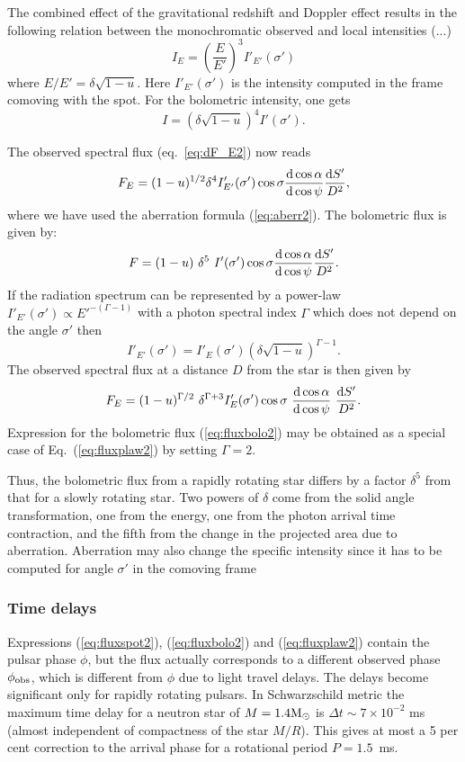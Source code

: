 \documentclass{wihuri}
\def\be{\begin{equation}}
\def\ee{\end{equation}}
\def\msun{{\rm M_{\odot}}}
\def\d{{\rm d}}
\def\Dop{\delta}
\def\phiobs{\phi_{\rm obs}}
\begin{document}
The combined effect of the gravitational redshift and Doppler effect
results in the following  relation between the monochromatic
observed and local intensities
(...)%
\be
I_{E} = \left (\frac{E}{E'}\right )^3 I'_{E '} (\sigma')
\ee
where $E/E'=\Dop \sqrt{1-u}$.
Here $I'_{E'}(\sigma')$ is the intensity computed in the frame comoving with
the spot.
For the bolometric intensity, one gets
\be
I= \left (\Dop \sqrt{1-u} \right )^4 I'(\sigma') .
\ee

The observed spectral flux (eq.~\ref{eq:dF_E2}) now reads
\be \label{eq:fluxspot2}
F_{E}=(1-u)^{1/2} \Dop^{4} I'_{E'}(\sigma') \cos\sigma
\frac{\d \cos\alpha}{\d\cos\psi}
 \frac{\d S'}{D^2} ,
\ee
where we have used the aberration formula (\ref{eq:aberr2}).
The bolometric flux is given by:
\be  \label{eq:fluxbolo2}
F= (1-u)\ \Dop^5 \
I'(\sigma')  \cos\sigma \frac{\d\cos\alpha}{\d\cos\psi} \frac{\d S'}{D^2} .
\ee
If the radiation spectrum can be represented by
a power-law $I'_{E'}(\sigma') \propto E '^{-(\Gamma-1)}$
with a photon spectral index
$\Gamma$ which does not depend on the angle $\sigma'$ then
\be \label{eq:int_trans2}
I'_{E'}(\sigma') = I'_{E}(\sigma')
\left( \Dop \sqrt{1-u} \right)^{\Gamma-1} .
\ee
The observed spectral flux at a distance $D$ from the star is then given by 
\be\label{eq:fluxplaw2}
 F_{E}= (1-u)^{\Gamma/2}\ \Dop^{\Gamma+3} I'_E(\sigma')
\cos\sigma\ \frac{\d\cos\alpha}{\d\cos\psi}\ \frac{\d S'}{D^2}.
\ee
Expression for the bolometric flux (\ref{eq:fluxbolo2})
may be obtained as a special case of Eq.~(\ref{eq:fluxplaw2}) by setting $\Gamma=2$. 

Thus, the bolometric flux from a rapidly rotating star differs by a factor  $\Dop^5$
from that for a slowly rotating star. Two powers of $\Dop$ come
from the solid angle transformation, one from the energy, one from the
photon arrival time contraction,
and the fifth from the change in the projected  area due to  aberration.
Aberration may also change the specific intensity since it has to be computed
for angle $\sigma'$ in the comoving frame




\subsubsection{Time delays}



Expressions (\ref{eq:fluxspot2}), (\ref{eq:fluxbolo2}) and (\ref{eq:fluxplaw2}) 
contain the pulsar phase $\phi$, but the flux actually corresponds to a different 
observed phase $\phiobs$, which is different from $\phi$ due to light travel delays.  
The delays become significant only for rapidly rotating pulsars.
In Schwarzschild metric the maximum time delay for a neutron star
of $M=1.4\msun$ is $\Delta t\sim 7\times 10^{-2}$ ms (almost independent
of compactness of the star $M/R$). This gives at most 
a 5 per cent correction to the arrival phase for a rotational period $P=1.5$~ms.
   
\end{document}
